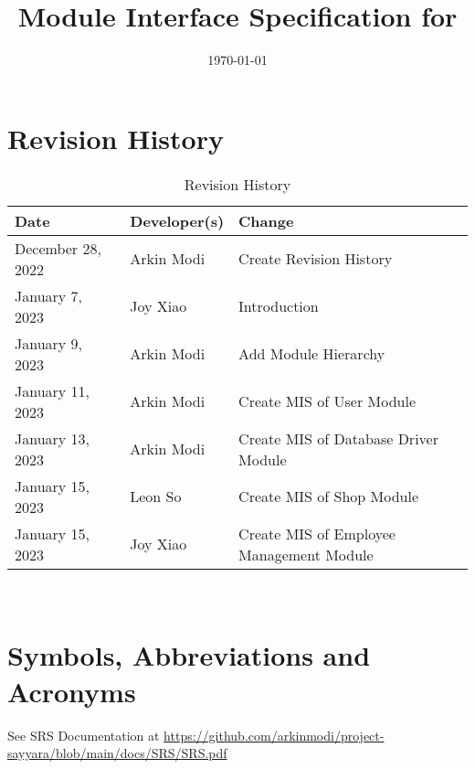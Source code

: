 \documentclass[12pt, titlepage]{article}
\begin{document}
\title{Module Interface Specification for \progname{}}

\author{\authname}

\date{\today}

\maketitle


\section{Revision History}

\begin{table}[hp]
	\caption{Revision History} \label{TblRevisionHistory}
	\begin{tabularx}{\textwidth}{llX}
		\toprule
		\textbf{Date}     & \textbf{Developer(s)} & \textbf{Change}                          \\
		\midrule
		December 28, 2022 & Arkin Modi            & Create Revision History                  \\
		January 7, 2023   & Joy Xiao              & Introduction                             \\
		January 9, 2023   & Arkin Modi            & Add Module Hierarchy                     \\
		January 11, 2023  & Arkin Modi            & Create MIS of User Module                \\
		January 13, 2023  & Arkin Modi            & Create MIS of Database Driver Module     \\
		January 15, 2023  & Leon So               & Create MIS of Shop Module                \\
		January 15, 2023  & Joy Xiao              & Create MIS of Employee Management Module \\
		\bottomrule
	\end{tabularx}
\end{table}

~\newpage

\section{Symbols, Abbreviations and Acronyms}

See SRS Documentation at
\url{https://github.com/arkinmodi/project-sayyara/blob/main/docs/SRS/SRS.pdf}

\end{document}
